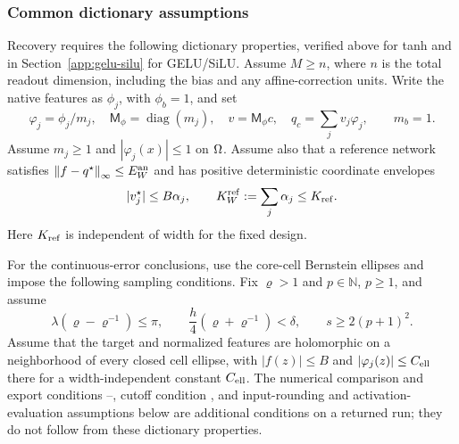 \subsubsection{Common dictionary assumptions}
Recovery requires the following dictionary properties, verified above for
tanh and in Section~\ref{app:gelu-silu} for GELU/SiLU.
Assume $M\ge n$, where $n$ is the total readout dimension, including the bias
and any affine-correction units. Write the native features as $\phi_j$, with
$\phi_b=1$, and set
\begin{equation}
 \varphi_j=\phi_j/m_j,\quad
 \mathsf M_\phi=\operatorname{diag}(m_j),\quad v=\mathsf M_\phi c,
 \quad q_c=\sum_jv_j\varphi_j,
 \qquad m_b=1.
 \label{eq:normalized-dictionary}
\end{equation}
Assume $m_j\ge1$ and $|\varphi_j(x)|\le1$ on $\Omega$. Assume also that a
reference network satisfies $\left\lVert f-q^\star\right\rVert_\infty\le E_W^{\rm an}$ and
has positive deterministic coordinate envelopes
\begin{equation}
 |v_j^\star|\le B\alpha_j,\qquad
 K_W^{\rm ref}:=\sum_j\alpha_j\le K_{\rm ref}.
 \label{eq:coordinate-envelope}
\end{equation}
Here $K_{\rm ref}$ is independent of width for the fixed design.

For the continuous-error conclusions, use the core-cell Bernstein ellipses
and impose the following sampling conditions.
Fix $\varrho>1$ and $p\in\mathbb N$, $p\ge1$, and assume
\begin{equation}
 \lambda(\varrho-\varrho^{-1})\le\pi,\qquad
 \frac h4(\varrho+\varrho^{-1})<\delta,\qquad s\ge2(p+1)^2.
 \label{eq:sampling-conditions}
\end{equation}
Assume that the target and normalized features are holomorphic on a
neighborhood of every closed cell ellipse, with $|f(z)|\le B$ and
$|\varphi_j(z)|\le C_{\rm ell}$ there for a width-independent constant
$C_{\rm ell}$. The numerical comparison and export conditions
--, cutoff condition
, and input-rounding and activation-evaluation assumptions
below are additional conditions on a returned run; they do not follow from
these dictionary properties.

